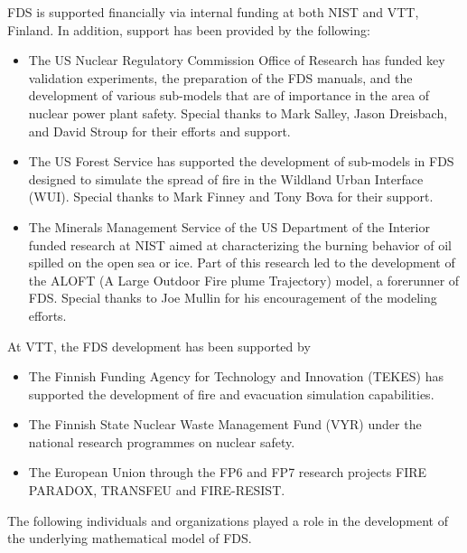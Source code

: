 \documentclass[11pt]{book}
\begin{document}
FDS is supported financially via internal funding at both NIST and VTT, Finland. In addition, support has been provided by the following:
\begin{itemize}
\item The US Nuclear Regulatory Commission Office of Research has funded key validation experiments, the preparation of the FDS manuals, and the development of various sub-models that are of importance in the area of nuclear power plant safety. Special thanks to Mark Salley, Jason Dreisbach, and David Stroup for their efforts and support.
\item The US Forest Service has supported the development of sub-models in FDS designed to simulate the spread of fire in the Wildland Urban Interface (WUI). Special thanks to Mark Finney and Tony Bova for their support.
\item The Minerals Management Service of the US Department of the Interior funded research at NIST aimed at characterizing the burning behavior of oil spilled on the open sea or ice. Part of this research led to the development of the ALOFT (A Large Outdoor Fire plume Trajectory) model, a forerunner of FDS. Special thanks to Joe Mullin for his encouragement of the modeling efforts.
\end{itemize}
\noindent At VTT, the FDS development has been supported by
\begin{itemize}
\item The Finnish Funding Agency for Technology and Innovation (TEKES) has supported the development of fire and evacuation simulation capabilities.
\item The Finnish State Nuclear Waste Management Fund (VYR) under the national research programmes on nuclear safety.
\item The European Union through the FP6 and FP7 research projects FIRE PARADOX, TRANSFEU and FIRE-RESIST.
\end{itemize}
The following individuals and organizations played a role in the development of the underlying mathematical model of FDS.
\end{document}
